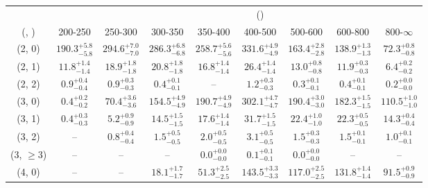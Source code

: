 \begin{table}[h!]
\tiny
\centering
{}
\begin{tabular}
{ccccccccc}
	\hline\hline
&	& \multicolumn{8}{c}{\scalht (\gev)} \\ 
	 (\njet,  \nb) & 200-250 & 250-300 & 300-350 & 350-400 & 400-500 & 500-600 & 600-800 & 800-$\infty$ \\ [0.8ex] 
\hline
	(2, 0) & $190.3^{+ 5.8 }_{- 5.8 }$ & $294.6^{+ 7.0 }_{- 7.0 }$ & $286.3^{+ 6.8 }_{- 6.8 }$ & $258.7^{+ 5.6 }_{- 5.6 }$ & $331.6^{+ 4.9 }_{- 4.9 }$ & $163.4^{+ 2.8 }_{- 2.8 }$ & $138.9^{+ 1.3 }_{- 1.3 }$ & $72.3^{+ 0.8 }_{- 0.8 }$ \\[0.5ex] 
	(2, 1) & $11.8^{+ 1.4 }_{- 1.4 }$ & $18.9^{+ 1.8 }_{- 1.8 }$ & $20.8^{+ 1.8 }_{- 1.8 }$ & $16.8^{+ 1.4 }_{- 1.4 }$ & $26.4^{+ 1.4 }_{- 1.4 }$ & $13.0^{+ 0.8 }_{- 0.8 }$ & $11.9^{+ 0.3 }_{- 0.3 }$ & $6.4^{+ 0.2 }_{- 0.2 }$ \\[0.5ex] 
	(2, 2) & $0.9^{+ 0.4 }_{- 0.4 }$ & $0.9^{+ 0.3 }_{- 0.3 }$ & $0.4^{+ 0.1 }_{- 0.1 }$ & -- & $1.2^{+ 0.3 }_{- 0.3 }$ & $0.3^{+ 0.1 }_{- 0.1 }$ & $0.4^{+ 0.1 }_{- 0.1 }$ & $0.2^{+ 0.0 }_{- 0.0 }$ \\[0.5ex] 
	(3, 0) & $0.4^{+ 0.2 }_{- 0.2 }$ & $70.4^{+ 3.6 }_{- 3.6 }$ & $154.5^{+ 4.9 }_{- 4.9 }$ & $190.7^{+ 4.9 }_{- 4.9 }$ & $302.1^{+ 4.7 }_{- 4.7 }$ & $190.4^{+ 3.0 }_{- 3.0 }$ & $182.3^{+ 1.5 }_{- 1.5 }$ & $110.5^{+ 1.0 }_{- 1.0 }$ \\[0.5ex] 
	(3, 1) & $0.4^{+ 0.3 }_{- 0.3 }$ & $5.2^{+ 0.9 }_{- 0.9 }$ & $14.5^{+ 1.5 }_{- 1.5 }$ & $17.6^{+ 1.4 }_{- 1.4 }$ & $31.7^{+ 1.5 }_{- 1.5 }$ & $22.4^{+ 1.0 }_{- 1.0 }$ & $22.3^{+ 0.5 }_{- 0.5 }$ & $14.3^{+ 0.4 }_{- 0.4 }$ \\[0.5ex] 
	(3, 2) & -- & $0.8^{+ 0.4 }_{- 0.4 }$ & $1.5^{+ 0.5 }_{- 0.5 }$ & $2.0^{+ 0.5 }_{- 0.5 }$ & $3.1^{+ 0.5 }_{- 0.5 }$ & $1.5^{+ 0.3 }_{- 0.3 }$ & $1.5^{+ 0.1 }_{- 0.1 }$ & $1.0^{+ 0.1 }_{- 0.1 }$ \\[0.5ex] 
	(3, $\ge3$) & -- & -- & -- & $0.0^{+ 0.0 }_{- 0.0 }$ & $0.1^{+ 0.1 }_{- 0.1 }$ & $0.0^{+ 0.0 }_{- 0.0 }$ & -- & -- \\[0.5ex] 
	(4, 0) & -- & -- & $18.1^{+ 1.7 }_{- 1.7 }$ & $51.3^{+ 2.5 }_{- 2.5 }$ & $143.5^{+ 3.3 }_{- 3.3 }$ & $117.0^{+ 2.5 }_{- 2.5 }$ & $131.8^{+ 1.4 }_{- 1.4 }$ & $91.5^{+ 0.9 }_{- 0.9 }$ \\[0.5ex] 

\end{tabular}
\end{table}
